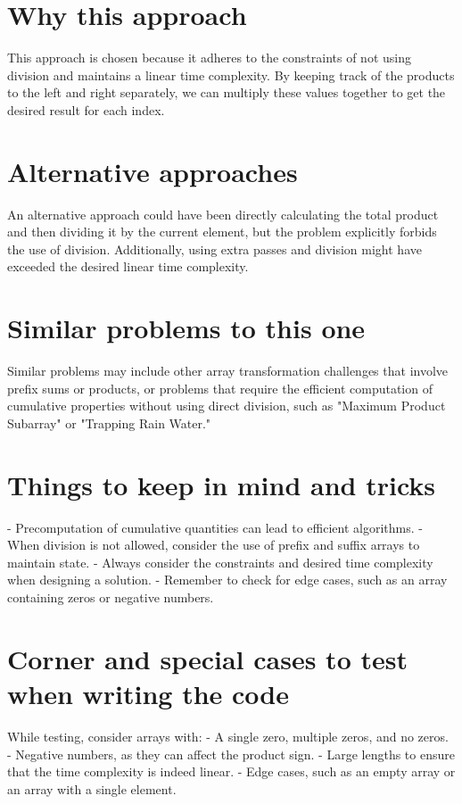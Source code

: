 \section*{Why this approach}
This approach is chosen because it adheres to the constraints of not using division and maintains a linear time complexity. By keeping track of the products to the left and right separately, we can multiply these values together to get the desired result for each index.

\section*{Alternative approaches}
An alternative approach could have been directly calculating the total product and then dividing it by the current element, but the problem explicitly forbids the use of division. Additionally, using extra passes and division might have exceeded the desired linear time complexity.

\section*{Similar problems to this one}
Similar problems may include other array transformation challenges that involve prefix sums or products, or problems that require the efficient computation of cumulative properties without using direct division, such as "Maximum Product Subarray" or "Trapping Rain Water."

\section*{Things to keep in mind and tricks}
- Precomputation of cumulative quantities can lead to efficient algorithms.
- When division is not allowed, consider the use of prefix and suffix arrays to maintain state.
- Always consider the constraints and desired time complexity when designing a solution.
- Remember to check for edge cases, such as an array containing zeros or negative numbers.

\section*{Corner and special cases to test when writing the code}
While testing, consider arrays with:
- A single zero, multiple zeros, and no zeros.
- Negative numbers, as they can affect the product sign.
- Large lengths to ensure that the time complexity is indeed linear.
- Edge cases, such as an empty array or an array with a single element.